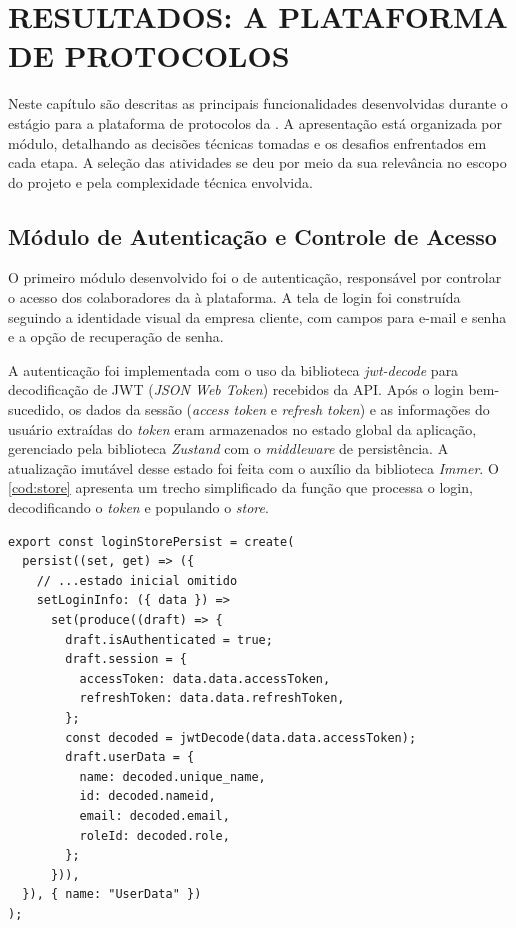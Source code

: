 \chapter{\MakeUppercase{Resultados: A Plataforma de Protocolos}}

Neste capítulo são descritas as principais funcionalidades desenvolvidas durante o estágio para a plataforma de protocolos da . A apresentação está organizada por módulo, detalhando as decisões técnicas tomadas e os desafios enfrentados em cada etapa. A seleção das atividades se deu por meio da sua relevância no escopo do projeto e pela complexidade técnica envolvida.

\section{Módulo de Autenticação e Controle de Acesso}

O primeiro módulo desenvolvido foi o de autenticação, responsável por controlar o acesso dos colaboradores da  à plataforma. A tela de login foi construída seguindo a identidade visual da empresa cliente, com campos para e-mail e senha e a opção de recuperação de senha.

A autenticação foi implementada com o uso da biblioteca \textit{jwt-decode} para decodificação de  JWT (\textit{JSON Web Token}) recebidos da API. Após o login bem-sucedido, os dados da sessão (\textit{access token} e \textit{refresh token}) e as informações do usuário extraídas do \textit{token} eram armazenados no estado global da aplicação, gerenciado pela biblioteca \textit{Zustand} com o \textit{middleware} de persistência. A atualização imutável desse estado foi feita com o auxílio da biblioteca \textit{Immer}. O \autoref{cod:store} apresenta um trecho simplificado da função que processa o login, decodificando o \textit{token} e populando o \textit{store}.

\begin{lstlisting}[caption={Trecho do \textit{store} de autenticação (\textit{Zustand}) com \textit{Immer} e \textit{jwt-decode}.}, label={cod:store}]
export const loginStorePersist = create(
  persist((set, get) => ({
    // ...estado inicial omitido
    setLoginInfo: ({ data }) =>
      set(produce((draft) => {
        draft.isAuthenticated = true;
        draft.session = {
          accessToken: data.data.accessToken,
          refreshToken: data.data.refreshToken,
        };
        const decoded = jwtDecode(data.data.accessToken);
        draft.userData = {
          name: decoded.unique_name,
          id: decoded.nameid,
          email: decoded.email,
          roleId: decoded.role,
        };
      })),
  }), { name: "UserData" })
);
\end{lstlisting}

